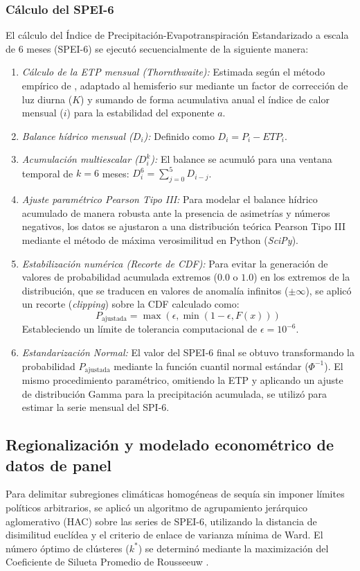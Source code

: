 \documentclass[11pt,a4paper]{article}
\begin{document}
\subsubsection{Cálculo del SPEI-6}
El cálculo del Índice de Precipitación-Evapotranspiración Estandarizado a escala de 6 meses (SPEI-6) se ejecutó secuencialmente de la siguiente manera:
\begin{enumerate}
    \item \textit{Cálculo de la ETP mensual (Thornthwaite):} Estimada según el método empírico de \citet{thornthwaite_approach_1948}, adaptado al hemisferio sur mediante un factor de corrección de luz diurna ($K$) y sumando de forma acumulativa anual el índice de calor mensual ($i$) para la estabilidad del exponente $a$.
    \item \textit{Balance hídrico mensual ($D_i$):} Definido como $D_i = P_i - ETP_i$.
    \item \textit{Acumulación multiescalar ($D^k_i$):} El balance se acumuló para una ventana temporal de $k=6$ meses: $D^6_i = \sum_{j=0}^{5} D_{i-j}$.
    \item \textit{Ajuste paramétrico Pearson Tipo III:} Para modelar el balance hídrico acumulado de manera robusta ante la presencia de asimetrías y números negativos, los datos se ajustaron a una distribución teórica Pearson Tipo III mediante el método de máxima verosimilitud en Python (\textit{SciPy}).
    \item \textit{Estabilización numérica (Recorte de CDF):} Para evitar la generación de valores de probabilidad acumulada extremos ($0.0$ o $1.0$) en los extremos de la distribución, que se traducen en valores de anomalía infinitos ($\pm \infty$), se aplicó un recorte (\textit{clipping}) sobre la CDF calculado como:
    \begin{equation}
        P_{\text{ajustada}} = \max\left(\epsilon, \min\left(1 - \epsilon, F(x)\right)\right)
    \end{equation}
    Estableciendo un límite de tolerancia computacional de $\epsilon = 10^{-6}$.
    \item \textit{Estandarización Normal:} El valor del SPEI-6 final se obtuvo transformando la probabilidad $P_{\text{ajustada}}$ mediante la función cuantil normal estándar ($\Phi^{-1}$). El mismo procedimiento paramétrico, omitiendo la ETP y aplicando un ajuste de distribución Gamma para la precipitación acumulada, se utilizó para estimar la serie mensual del SPI-6.
\end{enumerate}

\subsection{Regionalización y modelado econométrico de datos de panel}
Para delimitar subregiones climáticas homogéneas de sequía sin imponer límites políticos arbitrarios, se aplicó un algoritmo de agrupamiento jerárquico aglomerativo (HAC) sobre las series de SPEI-6, utilizando la distancia de disimilitud euclídea y el criterio de enlace de varianza mínima de Ward. El número óptimo de clústeres ($k^*$) se determinó mediante la maximización del Coeficiente de Silueta Promedio de Rousseeuw \citep{rousseeuw1987}.
\end{document}
